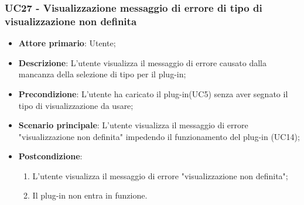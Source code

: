 \subsubsection{UC27 - Visualizzazione messaggio di errore di tipo di visualizzazione non definita}
\label{sssec:uc27}
\begin{itemize}
  \item \textbf{Attore primario}: Utente;
  \item \textbf{Descrizione}: L'utente visualizza il messaggio di errore causato dalla mancanza della selezione di tipo per il plug-in;
  \item \textbf{Precondizione}: L'utente ha caricato il plug-in(UC5) senza aver segnato il tipo di visualizzazione da usare;
  \item \textbf{Scenario principale}: L'utente visualizza il messaggio di errore "visualizzazione non definita" impedendo il funzionamento del plug-in (UC14);
  \item \textbf{Postcondizione}:
  \begin{enumerate}
		\item L'utente visualizza il messaggio di errore "visualizzazione non definita";
		\item Il plug-in non entra in funzione.
	\end{enumerate}
\end{itemize}
